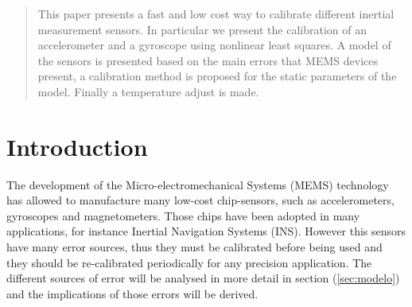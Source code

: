 \documentclass[conference]{IEEEtran}
\newcommand{\refp}[1]{(\ref{#1})}
\begin{document}




\maketitle


\begin{abstract}
This paper presents a fast and low cost way to calibrate different inertial measurement sensors. In particular we present the calibration of an accelerometer and a gyroscope using nonlinear least squares. A model of the sensors is presented based on the main errors that MEMS devices present, a calibration method is proposed for the static parameters of the model. Finally a temperature adjust is made.  
\end{abstract}





%
\IEEEpeerreviewmaketitle

\section{Introduction}
The development of the Micro-electromechanical Systems (MEMS) technology has allowed to manufacture many low-cost chip-sensors, such as accelerometers, gyroscopes and magnetometers. Those chips have been adopted in many applications, for instance Inertial Navigation Systems  (INS)\cite{bib:un_puto_nuevo}. However this sensors have many error sources, thus they must be calibrated before being used and they should be re-calibrated periodically for any precision application. The different sources of error will be analysed in more detail in section \refp{sec:modelo} and the implications of those errors will be derived.\\ 
\end{document}

